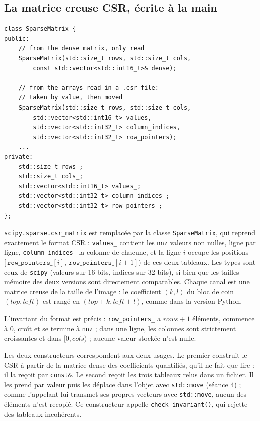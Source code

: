 \documentclass[10pt,a4paper]{article}
\newcommand{\code}[1]{\texttt{#1}}
\begin{document}
\subsection{La matrice creuse CSR, écrite à la main}
\begin{minipage}[t]{0.45\textwidth}
\vspace{0pt}
\begin{lstlisting}
class SparseMatrix {
public:
    // from the dense matrix, only read
    SparseMatrix(std::size_t rows, std::size_t cols,
        const std::vector<std::int16_t>& dense);

    // from the arrays read in a .csr file:
    // taken by value, then moved
    SparseMatrix(std::size_t rows, std::size_t cols,
        std::vector<std::int16_t> values,
        std::vector<std::int32_t> column_indices,
        std::vector<std::int32_t> row_pointers);
    ...
private:
    std::size_t rows_;
    std::size_t cols_;
    std::vector<std::int16_t> values_;
    std::vector<std::int32_t> column_indices_;
    std::vector<std::int32_t> row_pointers_;
};
\end{lstlisting}
\end{minipage}\hfill
\begin{minipage}[t]{0.525\textwidth}
\vspace{0pt}
\code{scipy.sparse.csr\_matrix} est remplacée par la classe \code{SparseMatrix}, qui reprend
exactement le format CSR : \code{values\_} contient les \code{nnz} valeurs non nulles, ligne par
ligne, \code{column\_indices\_} la colonne de chacune, et la ligne $i$ occupe les positions
$[\,\mathtt{row\_pointers\_}[i],\ \mathtt{row\_pointers\_}[i+1])$ de ces deux tableaux. Les types
sont ceux de \code{scipy} (valeurs sur 16 bits, indices sur 32 bits), si bien que les tailles
mémoire des deux versions sont directement comparables. Chaque canal est une matrice creuse de
la taille de l'image : le coefficient $(k, l)$ du bloc de coin $(\mathit{top}, \mathit{left})$
est rangé en $(\mathit{top}+k, \mathit{left}+l)$, comme dans la version Python.

L'invariant du format est précis : \code{row\_pointers\_} a $\mathit{rows}+1$ éléments, commence
à 0, croît et se termine à \code{nnz} ; dans une ligne, les colonnes sont strictement croissantes
et dans $[0, \mathit{cols})$ ; aucune valeur stockée n'est nulle.
\end{minipage}

\smallskip
Les deux constructeurs correspondent aux deux usages. Le premier construit le CSR à partir de la
matrice dense des coefficients quantifiés, qu'il ne fait que lire : il la reçoit par
\code{const\&}. Le second reçoit les trois tableaux relus dans un fichier. Il les prend par
valeur puis les déplace dans l'objet avec \code{std::move} (séance 4) ; comme l'appelant lui
transmet ses propres vecteurs avec \code{std::move}, aucun des éléments n'est recopié. Ce
constructeur appelle \code{check\_invariant()}, qui rejette des tableaux incohérents.
\end{document}

